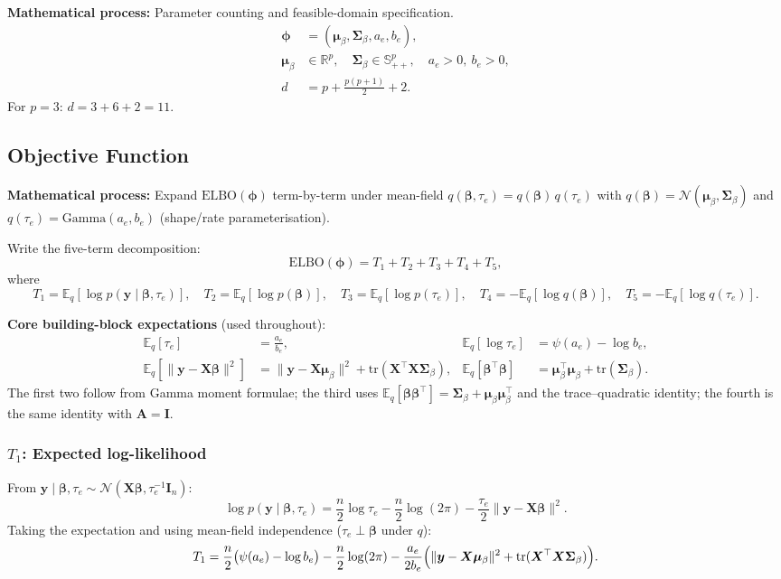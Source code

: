 \documentclass[11pt]{article}
\newcommand{\E}{\mathbb{E}}
\newcommand{\R}{\mathbb{R}}
\newcommand{\N}{\mathcal{N}}
\newcommand{\ELBO}{\mathrm{ELBO}}
\newcommand{\tr}{\mathrm{tr}}
\begin{document}
\textbf{Mathematical process:} Parameter counting and feasible-domain specification.
\begin{align}
\bm\phi &= (\bm\mu_\beta,\bm\Sigma_\beta,a_e,b_e),\\
\bm\mu_\beta &\in \R^p,\quad \bm\Sigma_\beta\in\mathbb S_{++}^p,\quad a_e>0,\ b_e>0,\\
d &= p + \frac{p(p+1)}{2} + 2.
\end{align}
For $p=3$: $d=3+6+2=11$.

\subsection*{Objective Function}

\textbf{Mathematical process:} Expand $\ELBO(\bm\phi)$ term-by-term under mean-field
$q(\bm\beta,\tau_e)=q(\bm\beta)\,q(\tau_e)$ with
$q(\bm\beta)=\N(\bm\mu_\beta,\bm\Sigma_\beta)$ and
$q(\tau_e)=\mathrm{Gamma}(a_e,b_e)$ (shape/rate parameterisation).

Write the five-term decomposition:
\begin{equation}
\ELBO(\bm\phi)= T_1+T_2+T_3+T_4+T_5,
\end{equation}
where
\[
T_1=\E_q[\log p(\bm y\mid\bm\beta,\tau_e)],\quad
T_2=\E_q[\log p(\bm\beta)],\quad
T_3=\E_q[\log p(\tau_e)],\quad
T_4=-\E_q[\log q(\bm\beta)],\quad
T_5=-\E_q[\log q(\tau_e)].
\]

\textbf{Core building-block expectations} (used throughout):
\begin{align}
\E_q[\tau_e] &= \frac{a_e}{b_e}, &
\E_q[\log\tau_e] &= \psi(a_e)-\log b_e,\\
\E_q\!\left[\|\bm y-\bm X\bm\beta\|^2\right]
  &= \|\bm y-\bm X\bm\mu_\beta\|^2+\tr(\bm X^\top\bm X\bm\Sigma_\beta), &
\E_q[\bm\beta^\top\bm\beta]
  &= \bm\mu_\beta^\top\bm\mu_\beta+\tr(\bm\Sigma_\beta).
\end{align}
The first two follow from Gamma moment formulae; the third uses
$\E_q[\bm\beta\bm\beta^\top]=\bm\Sigma_\beta+\bm\mu_\beta\bm\mu_\beta^\top$
and the trace–quadratic identity; the fourth is the same identity with $\bm A=\bm I$.

\subsubsection*{$T_1$: Expected log-likelihood}

From $\bm y\mid\bm\beta,\tau_e\sim\N(\bm X\bm\beta,\tau_e^{-1}\bm I_n)$:
\begin{equation}
\log p(\bm y\mid\bm\beta,\tau_e)
= \frac{n}{2}\log\tau_e - \frac{n}{2}\log(2\pi)
  - \frac{\tau_e}{2}\|\bm y-\bm X\bm\beta\|^2.
\end{equation}
Taking the expectation and using mean-field independence ($\tau_e\perp\bm\beta$ under $q$):
\begin{equation}
T_1 = \frac{n}{2}\bigl(\psi(a_e)-\log b_e\bigr)
    - \frac{n}{2}\log(2\pi)
    - \frac{a_e}{2b_e}\Bigl(\|\bm y-\bm X\bm\mu_\beta\|^2
      +\tr(\bm X^\top\bm X\bm\Sigma_\beta)\Bigr).
\end{equation}
\end{document}
